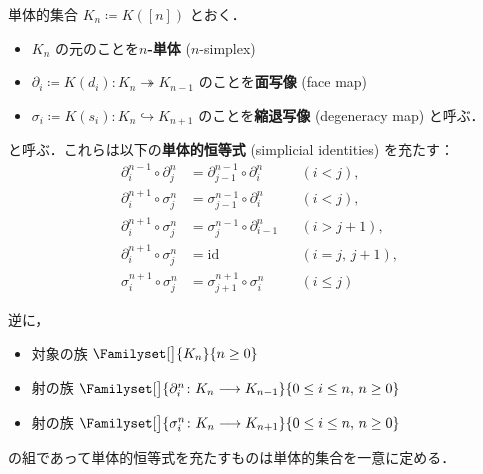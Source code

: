 \documentclass[TQFT_main]{subfiles}
\begin{document}
\begin{mydef}[label=def:SimpSet,breakable]{単体的集合}
    $K_n \coloneqq K([n])$ とおく．
    \begin{itemize}
        \item $K_n$ の元のことを\textbf{$n$-単体} ($n$-simplex)
        \item $\partial_i \coloneqq K(d_i) \colon K_{n} \twoheadrightarrow K_{n-1}$ のことを\textbf{面写像} (face map)
        \item $\sigma_i \coloneqq K(s_i) \colon K_n \hookrightarrow K_{n+1}$ のことを\textbf{縮退写像} (degeneracy map) と呼ぶ．
    \end{itemize}
    と呼ぶ．これらは以下の\textbf{単体的恒等式} (simplicial identities) を充たす：
    \begin{align}
        \partial^{n-1}_i \circ \partial^{n}_j &= \partial^{n-1}_{j-1} \circ \partial^{n}_i&& (i<j), \label{eq:Simp1}\\
        \partial^{n+1}_i \circ \sigma^{n}_j &= \sigma^{n-1}_{j-1} \circ \partial^{n}_i && (i<j), \label{eq:Simp2}\\
        \partial^{n+1}_i \circ \sigma^{n}_j &= \sigma^{n-1}_j \circ \partial^{n}_{i-1} &&(i > j+1), \label{eq:Simp3}\\
        \partial^{n+1}_i \circ \sigma^{n}_j &= \mathrm{id} &&(i = j,\, j+1), \label{eq:Simp4}\\
        \sigma^{n+1}_i \circ \sigma^{n}_j &= \sigma^{n+1}_{j+1} \circ \sigma^{n}_i &&(i \le j) \label{eq:Simp5}
    \end{align}
\end{mydef}

逆に，
\begin{itemize}
    \item 対象の族 $\Familyset[\big]{K_n}{n \ge 0}$
    \item 射の族 $\Familyset[\big]{\partial^n_i \colon K_n \lto K_{n-1}}{0 \le i \le n,\, n \ge 0}$
    \item 射の族 $\Familyset[\big]{\sigma^n_i \colon K_n \lto K_{n+1}}{0 \le i \le n,\, n \ge 0}$
\end{itemize}
の組であって単体的恒等式を充たすものは単体的集合を一意に定める\cite[\href{https://kerodon.net/tag/04FW}{Tag 04FW}]{kerodon}．
\end{document}
